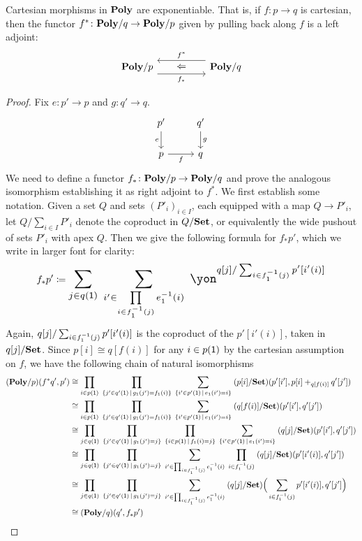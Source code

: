 \documentclass[Book-Poly]{subfiles}
\begin{document}
\begin{theorem}\label{thm.cart_exponentiable}
Cartesian morphisms in $\mathbf{Poly}$ are exponentiable.
That is, if $f\colon p\to q$ is cartesian, then the functor $f^*\colon\mathbf{Poly}/q\to\mathbf{Poly}/p$ given by pulling back along $f$ is a left adjoint:
\[
\begin{tikzcd}[column sep=50pt, background color=theoremcolor]
	\poly/p\ar[r, shift right=7pt, "f_*"']&
	\poly/q\ar[l, shift right=7pt, "f^*"']\ar[l, phantom, "\Leftarrow"]
\end{tikzcd}
\]
\end{theorem}
\begin{proof}
Fix $e\colon p'\to p$ and $g\colon q'\to q$.
\[
\begin{tikzcd}
	p'\ar[d, "e"']&q'\ar[d, "g"]\\
	p\ar[r, "f"']&q
\end{tikzcd}
\]
We need to define a functor $f_*\colon\mathbf{Poly}/p\to\mathbf{Poly}/q$ and prove the analogous isomorphism establishing it as right adjoint to $f^*$. We first establish some notation. Given a set $Q$ and sets $(P'_i)_{i\in I}$, each equipped with a map $Q\to P'_i$, let $Q/\sum_{i\in I}P'_i$ denote the coproduct in $Q/\mathbf{Set}$, or equivalently the wide pushout of sets $P'_i$ with apex $Q$. Then we give the following formula for $f_*p'$, which we write in larger font for clarity:
\begin{equation}\label{eqn.cart_exp}
f_*p'\coloneqq
\scalebox{1.3}{$\displaystyle
\sum_{j\in q(\1)}\;\sum_{i'\in\prod\limits_{i\in f_1\inv(j)}e_1\inv(i)}\;\yon^{q[j]/\sum_{i\in f_1\inv(j)}p'[i'(i)]}
$}
\end{equation}
Again, $q[j]/\sum_{i\in f_1^{-1}(j)}p'[i'(i)]$ is the coproduct of the $p'[i'(i)]$, taken in $q[j]/\mathbf{Set}$. Since $p[i]\cong q[f(i)]$ for any $i\in p(\textsf{1})$ by the cartesian assumption on $f$, we have the following chain of natural isomorphisms
\begin{align*}
	(\mathbf{Poly}/p)(f^*q', p')&\cong
	\prod_{i\in p(\textsf{1})}\;\prod_{\{j'\in q'(\textsf{1})\,\mid\,g_1(j')=f_1(i)\}}\;\sum_{\{i'\in p'(\textsf{1})\,\mid\,e_1(i')=i\}}\;(p[i]/\mathbf{Set})(p'[i'],p[i]+_{q[f(i)]}q'[j'])\\&\cong
	\prod_{i\in p(\textsf{1})}\;\prod_{\{j'\in q'(\textsf{1})\,\mid\,g_1(j')=f_1(i)\}}\;\sum_{\{i'\in p'(\textsf{1})\,\mid\,e_1(i')=i\}}\;(q[f(i)]/\mathbf{Set})(p'[i'],q'[j'])\\&\cong
	\prod_{j\in q(\textsf{1})}\;\prod_{\{j'\in q'(\textsf{1})\,\mid\, g_1(j')=j\}}\;\prod_{\{i\in p(\textsf{1})\,\mid\,f_1(i)=j\}}\;\sum_{\{i'\in p'(\textsf{1})\,\mid\,e_1(i')=i\}}\;(q[j]/\mathbf{Set})(p'[i'],q'[j'])\\&\cong
	\prod_{j\in q(\textsf{1})}\;\prod_{\{j'\in q'(\textsf{1})\,\mid\, g_1(j')=j\}}\;\sum_{i'\in\prod_{i\in f_1^{-1}(j)}e_1^{-1}(i)}\;\prod_{i\in f_1^{-1}(j)}\;(q[j]/\mathbf{Set})(p'[i'(i)],q'[j'])\\&\cong
	\prod_{j\in q(\textsf{1})}\;\prod_{\{j'\in q'(\textsf{1})\,\mid\, g_1(j')=j\}}\;\sum_{i'\in\prod_{i\in f_1^{-1}(j)}e_1^{-1}(i)}\;(q[j]/\mathbf{Set})\Big(\sum_{i\in f_1^{-1}(j)}p'[i'(i)],q'[j']\Big)\\&\cong
	(\mathbf{Poly}/q)(q',f_*p')
\end{align*}
\end{proof}
\end{document}
